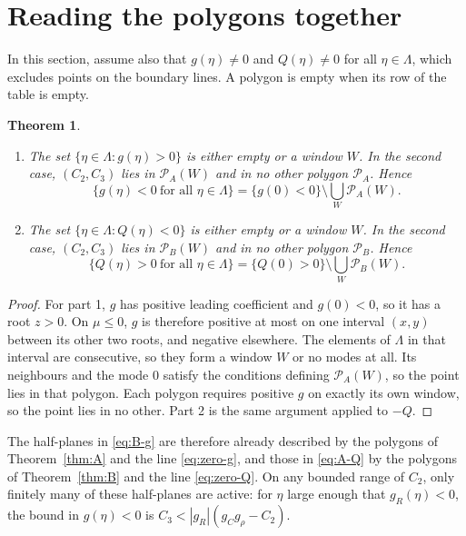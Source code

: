 \documentclass[11pt]{article}
\newtheorem{theorem}{Theorem}
\theoremstyle{definition}
\theoremstyle{remark}
\begin{document}
\section{Reading the polygons together}

In this section, assume also that $g(\eta)\neq0$ and $Q(\eta)\neq0$ for all $\eta\in\Lambda$, which excludes points on the boundary lines. A polygon is empty when its row of the table is empty.

\begin{theorem}\label{thm:complement}
\begin{enumerate}
\item The set $\{\eta\in\Lambda:g(\eta)>0\}$ is either empty or a window $W$. In the second case, $(C_2,C_3)$ lies in $\mathcal{P}_A(W)$ and in no other polygon $\mathcal{P}_A$. Hence
\[
\{g(\eta)<0\ \text{for all }\eta\in\Lambda\}=\{g(0)<0\}\setminus\bigcup_W\mathcal{P}_A(W).
\]
\item The set $\{\eta\in\Lambda:Q(\eta)<0\}$ is either empty or a window $W$. In the second case, $(C_2,C_3)$ lies in $\mathcal{P}_B(W)$ and in no other polygon $\mathcal{P}_B$. Hence
\[
\{Q(\eta)>0\ \text{for all }\eta\in\Lambda\}=\{Q(0)>0\}\setminus\bigcup_W\mathcal{P}_B(W).
\]
\end{enumerate}
\end{theorem}

\begin{proof}
For part 1, $g$ has positive leading coefficient and $g(0)<0$, so it has a root $z>0$. On $\mu\le0$, $g$ is therefore positive at most on one interval $(x,y)$ between its other two roots, and negative elsewhere. The elements of $\Lambda$ in that interval are consecutive, so they form a window $W$ or no modes at all. Its neighbours and the mode $0$ satisfy the conditions defining $\mathcal{P}_A(W)$, so the point lies in that polygon. Each polygon requires positive $g$ on exactly its own window, so the point lies in no other. Part 2 is the same argument applied to $-Q$.
\end{proof}

The half-planes in \eqref{eq:B-g} are therefore already described by the polygons of Theorem~\ref{thm:A} and the line \eqref{eq:zero-g}, and those in \eqref{eq:A-Q} by the polygons of Theorem~\ref{thm:B} and the line \eqref{eq:zero-Q}. On any bounded range of $C_2$, only finitely many of these half-planes are active: for $\eta$ large enough that $g_R(\eta)<0$, the bound in $g(\eta)<0$ is $C_3<|g_R|(g_Cg_\rho-C_2)$.
\end{document}
